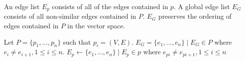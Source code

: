 

%
%
%
%
%
 













An edge list $E_{p}$ consists of all of the edges contained in $p$. A global edge list $E_{G}$ consists of all non-similar edges contained in $P$. $E_{G}$ preserves the ordering of edges contained in $P$ in the vector space. 

\begin{definition}

Let $P = \{p_1,...,p_n\}$ such that $p_i = (V, E)$. $E_{G} = \{ e_1,...,e_n\} \mid E_{G}  \in P$ where $e_i \neq e_{i+1}, 1 \leq i \leq n$. $E_{p} \gets \{e_1,...,e_n\} \mid E_{p} \in p$ where  $e_{pi} \neq e_{pi+1}, 1 \leq i \leq n$

\end{definition}



